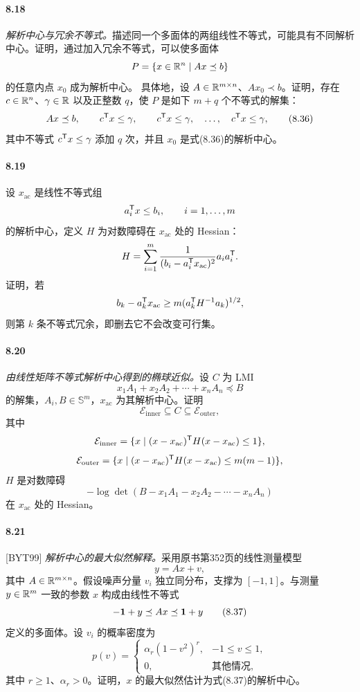 \paragraph{8.18}\textit{解析中心与冗余不等式。}描述同一个多面体的两组线性不等式，可能具有不同解析中心。证明，通过加入冗余不等式，可以使多面体
\[P=\{x\in\mathbb R^n\mid Ax\preceq b\}\]
的任意内点 $x_0$ 成为解析中心。
具体地，设 $A\in\mathbb R^{m\times n}$、$Ax_0\prec b$。证明，存在 $c\in\mathbb R^n$、$\gamma\in\mathbb R$ 以及正整数 $q$，使 $P$ 是如下 $m+q$ 个不等式的解集：
\begin{equation}Ax\preceq b,\qquad c^\mathsf T x\leq\gamma,\qquad c^\mathsf T x\leq\gamma,\quad\ldots,\quad c^\mathsf T x\leq\gamma,\tag{8.36}\end{equation}
其中不等式 $c^\mathsf T x\leq\gamma$ 添加 $q$ 次，并且 $x_0$ 是式(8.36)的解析中心。
\paragraph{8.19}设 $x_{\mathrm{ac}}$ 是线性不等式组
\[a_i^\mathsf T x\leq b_i,\qquad i=1,\ldots,m\]
的解析中心，定义 $H$ 为对数障碍在 $x_{\mathrm{ac}}$ 处的 Hessian：
\[H=\sum_{i=1}^m\frac1{(b_i-a_i^\mathsf T x_{\mathrm{ac}})^2}a_ia_i^\mathsf T.\]
证明，若
\[b_k-a_k^\mathsf T x_{\mathrm{ac}}\geq m(a_k^\mathsf T H^{-1}a_k)^{1/2},\]
则第 $k$ 条不等式冗余，即删去它不会改变可行集。
\paragraph{8.20}\textit{由线性矩阵不等式解析中心得到的椭球近似。}设 $C$ 为 LMI
\[x_1A_1+x_2A_2+\cdots+x_nA_n\preceq B\]
的解集，$A_i,B\in\mathbb S^m$，$x_{\mathrm{ac}}$ 为其解析中心。证明
\[\mathcal E_{\mathrm{inner}}\subseteq C\subseteq\mathcal E_{\mathrm{outer}},\]
其中
\[\mathcal E_{\mathrm{inner}}=\{x\mid(x-x_{\mathrm{ac}})^\mathsf T H(x-x_{\mathrm{ac}})\leq1\},\]
\[\mathcal E_{\mathrm{outer}}=\{x\mid(x-x_{\mathrm{ac}})^\mathsf T H(x-x_{\mathrm{ac}})\leq m(m-1)\},\]
$H$ 是对数障碍
\[-\log\det(B-x_1A_1-x_2A_2-\cdots-x_nA_n)\]
在 $x_{\mathrm{ac}}$ 处的 Hessian。
\paragraph{8.21}[BYT99] \textit{解析中心的最大似然解释。}采用原书第352页的线性测量模型
\[y=Ax+v,\]
其中 $A\in\mathbb R^{m\times n}$。假设噪声分量 $v_i$ 独立同分布，支撑为 $[-1,1]$。与测量 $y\in\mathbb R^m$ 一致的参数 $x$ 构成由线性不等式
\begin{equation}-\mathbf 1+y\preceq Ax\preceq\mathbf 1+y\tag{8.37}\end{equation}
定义的多面体。设 $v_i$ 的概率密度为
\[p(v)=\begin{cases}\alpha_r(1-v^2)^r,&-1\leq v\leq1,\\0,&\text{其他情况},\end{cases}\]
其中 $r\geq1$、$\alpha_r>0$。证明，$x$ 的最大似然估计为式(8.37)的解析中心。
